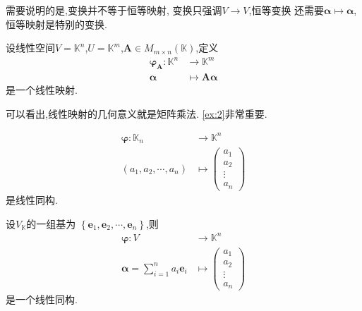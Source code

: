 \begin{red}
\begin{remark}
    需要说明的是,变换并不等于恒等映射,
变换只强调$V \longrightarrow V$,恒等变换
还需要$\bm{\alpha} \longmapsto
\bm{\alpha}$,
恒等映射是特别的变换.
\end{remark}
\end{red}
\begin{brown}
\begin{example}\label{ex:2}
    设线性空间$\displaystyle
    V = \mathbb{K}^n$,$\displaystyle
    U = \mathbb{K}^m$,$\bm{A} 
    \in M_{m \times n}\left(
        \mathbb{K}
    \right)$,定义
    \begin{align*}
        \bm{\varphi}_{\bm{A}}
        : \mathbb{K}^n & 
        \longrightarrow \mathbb{K}^m\\
        \bm{\alpha}& \longmapsto
        \bm{A\alpha}
    \end{align*}
    是一个线性映射.
\end{example}
\end{brown}
\begin{red}
\begin{remark}
    可以看出,线性映射的几何意义就是矩阵乘法.
    \cref{ex:2}非常重要.
\end{remark}
\end{red}
\begin{brown}
\begin{example}
    \begin{align*}
        \bm{\varphi}:
        \mathbb{K}_n &
        \longrightarrow
        \mathbb{K}^n\\
        \left(a_1,a_2,\cdots
        ,a_n\right)&
        \longmapsto
        \begin{pmatrix}
            a_1\\
            a_2\\
            \vdots\\
            a_n
        \end{pmatrix}
    \end{align*}
    是线性同构.
\end{example}
\end{brown}
\begin{brown}
\begin{example}
    设$V_{\mathbb{K}}$的一组基为
    $\left\{
        \bm{e}_1,\bm{e}_2,\cdots,\bm{e}_n
    \right\}$,则
    \begin{align*}
        \bm{\varphi}:
        V & \longrightarrow \mathbb{K}^n\\
        \bm{\alpha} = 
        \sum_{i = 1}^{n}a_i\bm{e}_i
        & \longmapsto \begin{pmatrix}
            a_1\\
            a_2\\
            \vdots\\
            a_n
        \end{pmatrix}
    \end{align*}
    是一个线性同构.
\end{example}
\end{brown}
